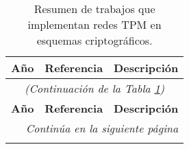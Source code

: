 \begin{longtable}{|c|p{2cm}|p{8.5cm}|}
    \caption{Resumen de trabajos que implementan redes TPM en esquemas criptográficos.}
    \label{tabla:resumen-tpm} \\
    \hline
    \textbf{Año} & \textbf{Referencia} & \textbf{Descripción} \\
    \hline
    \endfirsthead
    
    \hline
    \multicolumn{3}{|c|}{\textit{(Continuación de la Tabla \ref{tabla:resumen-tpm})}} \\
    \hline
    \textbf{Año} & \textbf{Referencia} & \textbf{Descripción} \\
    \hline
    \endhead
    
    \hline
    \multicolumn{3}{|r|}{\textit{Continúa en la siguiente página}} \\
    \hline
    \endfoot
    
    \hline
    \endlastfoot
    

\end{longtable}
